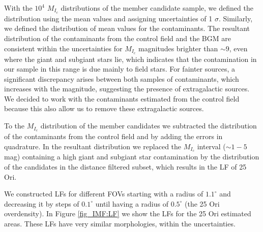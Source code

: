 \documentclass[12pt]{article}
\begin{document}
With the $10^4$ $M_{I_c}$ distributions of the member candidate sample, we defined the distribution using the mean values and assigning uncertainties of 1 $\sigma$. Similarly, we defined the distribution of mean values for the contaminants. The resultant distribution of the contaminants from the control field and the BGM are consistent within the uncertainties for $M_{I_c}$ magnitudes brighter than $\sim 9$, even where the giant and subgiant stars lie, which indicates that the contamination in our sample in this range is due mainly to field stars. For fainter sources, a significant discrepancy arises between both samples of contaminants, which increases with the magnitude, suggesting the presence of extragalactic sources. We decided to work with the contaminants estimated from the control field because this also allow us to remove these extragalactic sources.

To the $M_{I_c}$ distribution of the member candidates we subtracted the distribution of the contaminants from the control field and by adding the errors in quadrature. In the resultant distribution we replaced the $M_{I_c}$ interval ($\sim1-5$ mag) containing a high giant and subgiant star contamination by the distribution of the candidates in the distance filtered subset, which results in the LF of 25 Ori.

We constructed LFs for different FOVs starting with a radius of $1.1^\circ$ and decreasing it by steps of $0.1^\circ$ until having a radius of $0.5^\circ$ (the 25 Ori overdensity). In Figure \ref{fig_IMF:LF} we show the LFs for the 25 Ori estimated areas. These LFs have very similar morphologies, within the uncertainties.
\end{document}
